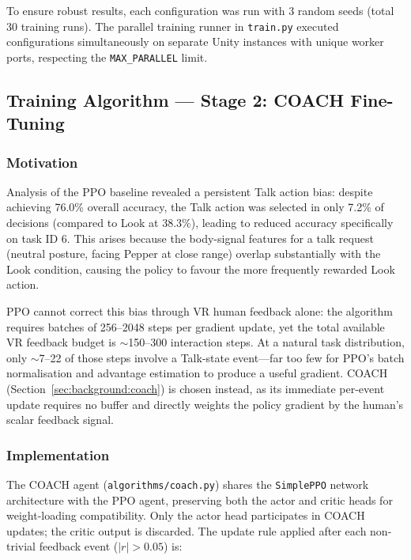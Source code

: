 \documentclass[../report.tex]{subfiles}
\begin{document}
    To ensure robust results, each configuration was run with 3 random seeds (total 30 training runs). The parallel training runner in \texttt{train.py} executed configurations simultaneously on separate Unity instances with unique worker ports, respecting the \texttt{MAX\_PARALLEL} limit.

    \subsection{Training Algorithm — Stage 2: COACH Fine-Tuning}
    \label{sec:methodology:coach}

    \subsubsection{Motivation}

    Analysis of the PPO baseline revealed a persistent Talk action bias: despite achieving 76.0\% overall accuracy, the Talk action was selected in only 7.2\% of decisions (compared to Look at 38.3\%), leading to reduced accuracy specifically on task ID 6. This arises because the body-signal features for a talk request (neutral posture, facing Pepper at close range) overlap substantially with the Look condition, causing the policy to favour the more frequently rewarded Look action.

    PPO cannot correct this bias through VR human feedback alone: the algorithm requires batches of 256--2048 steps per gradient update, yet the total available VR feedback budget is $\sim$150--300 interaction steps. At a natural task distribution, only $\sim$7--22 of those steps involve a Talk-state event—far too few for PPO's batch normalisation and advantage estimation to produce a useful gradient. COACH (Section~\ref{sec:background:coach}) is chosen instead, as its immediate per-event update requires no buffer and directly weights the policy gradient by the human's scalar feedback signal.

    \subsubsection{Implementation}

    The COACH agent (\texttt{algorithms/coach.py}) shares the \texttt{SimplePPO} network architecture with the PPO agent, preserving both the actor and critic heads for weight-loading compatibility. Only the actor head participates in COACH updates; the critic output is discarded. The update rule applied after each non-trivial feedback event ($|r| > 0.05$) is:
\end{document}
